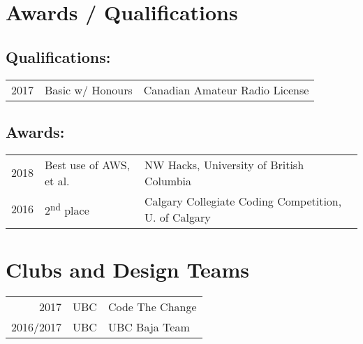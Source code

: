 \documentclass[]{deedy-resume-openfont}
\begin{document}
\begin{minipage}[t]{0.66\textwidth}

\section{Awards / Qualifications} 
\subsection{Qualifications:}
\begin{tabular}{rll}
2017         & Basic w/ Honours  & Canadian Amateur Radio License\\
\end{tabular}

\subsection{Awards:}
\begin{tabular}{rll}
2018         & Best use of AWS, et al.           & NW Hacks, University of British Columbia\\
2016         & 2\textsuperscript{nd} place  & Calgary Collegiate Coding Competition, U. of Calgary\\
\end{tabular}
\sectionsep


\section{Clubs and Design Teams} 

\begin{tabular}{rll}
2017        & UBC   & Code The Change\\
2016/2017   & UBC   & UBC Baja Team\\
\end{tabular}
\sectionsep

\end{minipage} 
\end{document}

